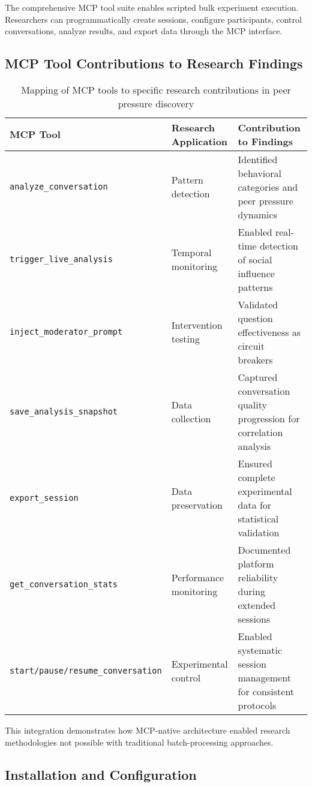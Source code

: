 \documentclass[11pt,letterpaper]{article}
\begin{document}
The comprehensive MCP tool suite enables scripted bulk experiment execution. Researchers can programmatically create sessions, configure participants, control conversations, analyze results, and export data through the MCP interface.

\subsection{MCP Tool Contributions to Research Findings}

\begin{table}[h]
\centering
\begin{tabular}{p{4cm}p{4cm}p{6cm}}
\toprule
\textbf{MCP Tool} & \textbf{Research Application} & \textbf{Contribution to Findings} \\
\midrule
\texttt{analyze\_conversation} & Pattern detection & Identified behavioral categories and peer pressure dynamics \\
\texttt{trigger\_live\_analysis} & Temporal monitoring & Enabled real-time detection of social influence patterns \\
\texttt{inject\_moderator\_prompt} & Intervention testing & Validated question effectiveness as circuit breakers \\
\texttt{save\_analysis\_snapshot} & Data collection & Captured conversation quality progression for correlation analysis \\
\texttt{export\_session} & Data preservation & Ensured complete experimental data for statistical validation \\
\texttt{get\_conversation\_stats} & Performance monitoring & Documented platform reliability during extended sessions \\
\texttt{start/pause/resume\_conversation} & Experimental control & Enabled systematic session management for consistent protocols \\
\bottomrule
\end{tabular}
\caption{Mapping of MCP tools to specific research contributions in peer pressure discovery}
\label{tab:mcp_contributions}
\end{table}

This integration demonstrates how MCP-native architecture enabled research methodologies not possible with traditional batch-processing approaches.

\subsection{Installation and Configuration}
\end{document}
